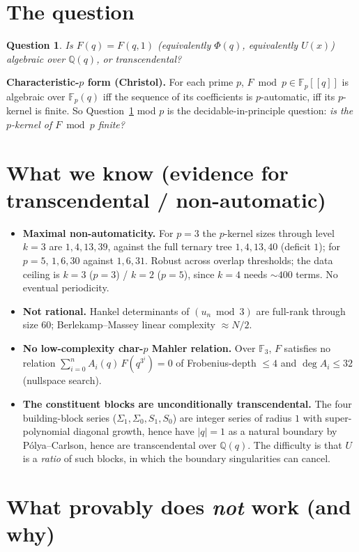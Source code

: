 \documentclass[11pt]{article}
\newtheorem{question}{Question}
\newcommand{\Q}{\mathbb{Q}}
\newcommand{\F}{\mathbb{F}}
\begin{document}
\section*{The question}

\begin{question}\label{q:main}
Is $F(q)=F(q,1)$ (equivalently $\Phi(q)$, equivalently $U(x)$) algebraic over $\Q(q)$, or transcendental?
\end{question}

\noindent\textbf{Characteristic-$p$ form (Christol).} For each prime $p$, $F\bmod p\in\F_p[[q]]$ is
algebraic over $\F_p(q)$ iff the sequence of its coefficients is $p$-automatic, iff its $p$-kernel is
finite. So Question~\ref{q:main} mod $p$ is the decidable-in-principle question: \emph{is the $p$-kernel
of $F\bmod p$ finite?}

\section*{What we know (evidence for transcendental / non-automatic)}

\begin{itemize}
\item \textbf{Maximal non-automaticity.} For $p=3$ the $p$-kernel sizes through level $k=3$ are
$1,4,13,39$, against the full ternary tree $1,4,13,40$ (deficit $1$); for $p=5$, $1,6,30$ against
$1,6,31$. Robust across overlap thresholds; the data ceiling is $k=3$ ($p=3$) / $k=2$ ($p=5$), since
$k=4$ needs $\sim 400$ terms. No eventual periodicity.
\item \textbf{Not rational.} Hankel determinants of $(u_n\bmod 3)$ are full-rank through size $60$;
Berlekamp--Massey linear complexity $\approx N/2$.
\item \textbf{No low-complexity char-$p$ Mahler relation.} Over $\F_3$, $F$ satisfies no relation
$\sum_{i=0}^n A_i(q)\,F(q^{3^i})=0$ of Frobenius-depth $\le4$ and $\deg A_i\le 32$ (nullspace search).
\item \textbf{The constituent blocks are unconditionally transcendental.} The four building-block
series ($\Sigma_1,\Sigma_0,S_1,S_0$) are integer series of radius $1$ with super-polynomial diagonal
growth, hence have $|q|=1$ as a natural boundary by P\'olya--Carlson, hence are transcendental over
$\Q(q)$. The difficulty is that $U$ is a \emph{ratio} of such blocks, in which the boundary
singularities can cancel.
\end{itemize}

\section*{What provably does \emph{not} work (and why)}
\end{document}
